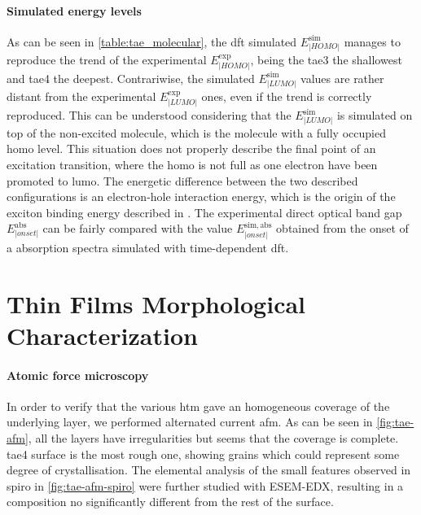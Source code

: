 	\paragraph{Simulated energy levels}
	As can be seen in \cref{table:tae_molecular}, the \gls{dft} simulated $E^{\mathrm{sim}}_|HOMO|$ manages to reproduce the trend of the experimental $E^{\mathrm{exp}}_|HOMO|$, being the \gls{tae3} the shallowest and \gls{tae4} the deepest.
	Contrariwise, the simulated $E^{\mathrm{sim}}_|LUMO|$ values are rather distant from the experimental $E^{\mathrm{exp}}_|LUMO|$ ones, even if the trend is correctly reproduced.
	This can be understood considering that the $E^{\mathrm{sim}}_|LUMO|$ is simulated on top of the non\hyp{}excited molecule, which is the molecule with a fully occupied \gls{homo} level.
	This situation does not properly describe the final point of an excitation transition, where the \gls{homo} is not full as one electron have been promoted to \gls{lumo}.
	The energetic difference between the two described configurations is an electron\hyp{}hole interaction energy, which is the origin of the exciton binding energy described in .
	The experimental direct optical band gap \small$E^{\mathrm{abs}}_|onset|$ can be fairly compared with the value $E^{\mathrm{sim,abs}}_|onset|$ obtained from the onset of a absorption spectra simulated with time\hyp{}dependent \gls{dft}.



\section{Thin Films Morphological Characterization}

	\paragraph{Atomic force microscopy}
	In order to verify that the various \gls{htm} gave an homogeneous coverage of the underlying layer, we performed alternated current \gls{afm}.
	As can be seen in \cref{fig:tae-afm}, all the layers have irregularities but seems that the coverage is complete.
	\Gls{tae4} surface is the most rough one, showing grains which could represent some degree of crystallisation.
	The elemental analysis of the small features observed in \gls{spiro} in \cref{fig:tae-afm-spiro} were further studied with ESEM-EDX, resulting in a composition no significantly different from the rest of the surface.
	
